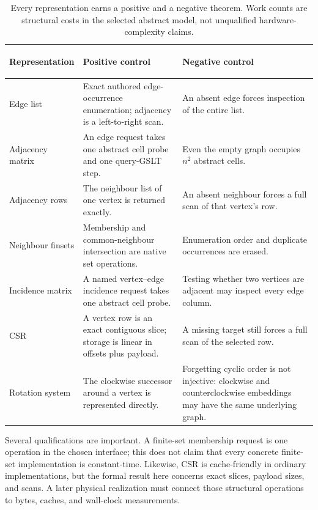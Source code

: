 \documentclass[11pt]{article}
\theoremstyle{remark}
\begin{document}
\begin{table}[htbp]
\centering
\small
\renewcommand{\arraystretch}{1.18}
\begin{tabularx}{\textwidth}{@{}>{\bfseries\raggedright\arraybackslash}p{}
  Y Y@{}}
\toprule
Representation & Positive control & Negative control \\
\midrule
Edge list & Exact authored edge-occurrence enumeration; adjacency is a
left-to-right scan. & An absent edge forces inspection of the entire list.\\
Adjacency matrix & An edge request takes one abstract cell probe and one
query-GSLT step. & Even the empty graph occupies \(n^2\) abstract cells.\\
Adjacency rows & The neighbour list of one vertex is returned exactly. & An
absent neighbour forces a full scan of that vertex's row.\\
Neighbour finsets & Membership and common-neighbour intersection are native
set operations. & Enumeration order and duplicate occurrences are erased.\\
Incidence matrix & A named vertex--edge incidence request takes one abstract
cell probe. & Testing whether two vertices are adjacent may inspect every edge
column.\\
CSR & A vertex row is an exact contiguous slice; storage is linear in offsets
plus payload. & A missing target still forces a full scan of the selected row.\\
Rotation system & The clockwise successor around a vertex is represented
directly. & Forgetting cyclic order is not injective: clockwise and
counterclockwise embeddings may have the same underlying graph.\\
\bottomrule
\end{tabularx}
\caption{Every representation earns a positive and a negative theorem.  Work
counts are structural costs in the selected abstract model, not unqualified
hardware-complexity claims.}
\label{tab:portfolio}
\end{table}

Several qualifications are important.  A finite-set membership request is
one operation in the chosen interface; this does not claim that every concrete
finite-set implementation is constant-time.  Likewise, CSR is cache-friendly
in ordinary implementations, but the formal result here concerns exact slices,
payload sizes, and scans.  A later physical realization must connect those
structural operations to bytes, caches, and wall-clock measurements.
\end{document}
